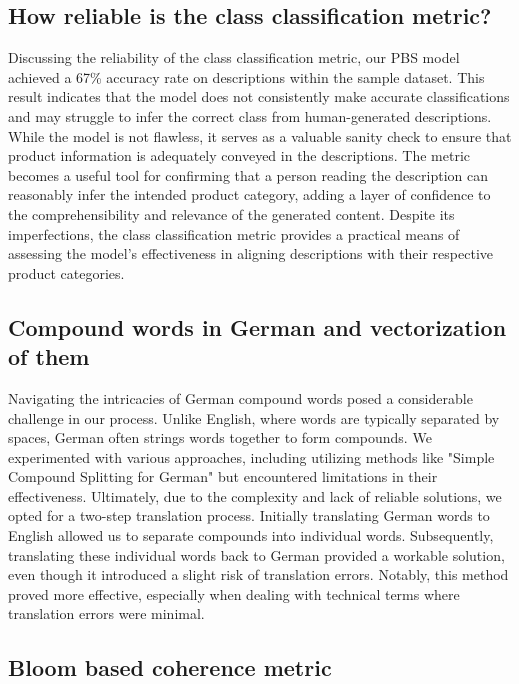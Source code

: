 \subsection{How reliable is the class classification metric?}

Discussing the reliability of the class classification metric, our PBS model achieved a 67\% accuracy rate on descriptions within the sample dataset. This result indicates that the model does not consistently make accurate classifications and may struggle to infer the correct class from human-generated descriptions. While the model is not flawless, it serves as a valuable sanity check to ensure that product information is adequately conveyed in the descriptions. The metric becomes a useful tool for confirming that a person reading the description can reasonably infer the intended product category, adding a layer of confidence to the comprehensibility and relevance of the generated content. Despite its imperfections, the class classification metric provides a practical means of assessing the model's effectiveness in aligning descriptions with their respective product categories.




\subsection{Compound words in German and vectorization of them}

Navigating the intricacies of German compound words posed a considerable challenge in our process. Unlike English, where words are typically separated by spaces, German often strings words together to form compounds. We experimented with various approaches, including utilizing methods like "Simple Compound Splitting for German"\cite{Compound_Splitting_German} but encountered limitations in their effectiveness. Ultimately, due to the complexity and lack of reliable solutions, we opted for a two-step translation process. Initially translating German words to English allowed us to separate compounds into individual words. Subsequently, translating these individual words back to German provided a workable solution, even though it introduced a slight risk of translation errors. Notably, this method proved more effective, especially when dealing with technical terms where translation errors were minimal.

\subsection{Bloom based coherence metric}

